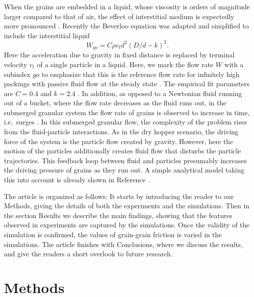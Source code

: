 \documentclass[twoside,twocolumn,9pt]{article}
\begin{document}
When the grains are embedded in a liquid, whose viscosity is orders of magnitude larger compared to that of air,
the effect of interstitial medium is expectedly more pronounced \cite{koivistoSubmitted}.
Recently the Beverloo equation was adapted and simplified to include the interstitial liquid \cite{Wilson2014} 
%
\begin{equation}
	W_{go} = C\rho v_t d^2 (D/d - k)^2 \label{eq:modified-beverloo}.
\end{equation}   
%
\noindent Here the acceleration due to gravity in fixed distance is replaced by terminal velocity $v_t$ of a single particle in a liquid. 
Here, we mark the flow rate $W$ with a subindex $go$ to emphasize that this is the reference flow rate for infinitely high packings with passive fluid flow at the steady state \cite{koivistoSubmitted}.
The empirical fit parameters are $C=0.4$ and $k=2.4$ \cite{Wilson2014,koivistoSubmitted}.  
In addition, as opposed to a Newtonian fluid running out of a bucket, where the flow rate decreases as the fluid runs out, in the submerged granular system the flow rate of grains is observed to increase in time, i.e.~surges \cite{Wilson2014}. In this submerged granular flow, the complexity of the problem rises from the fluid-particle interactions. As in the dry hopper scenario, the driving force of the system is the particle flow created by gravity. However, here the motion of the particles additionally creates fluid flow that disturbs the particle trajectories. This feedback loop between fluid and particles presumably increases the driving pressure of grains as they run out. A simple analytical model taking this into account is already shown in Reference~\cite{koivistoSubmitted}.



The article is organized as follows: It starts by introducing the reader to our Methods, giving the details of both the experiments and the simulations. Then in the section Results we describe the main findings, showing that the features observed in experiments are captured by the simulations. Once the validity of the simulation is confirmed, the values of grain-grain friction is varied in the simulations.
The article finishes with Conclusions, where we discuss the results, and give the readers a short overlook to future research.
 
\section{Methods}
\end{document}
